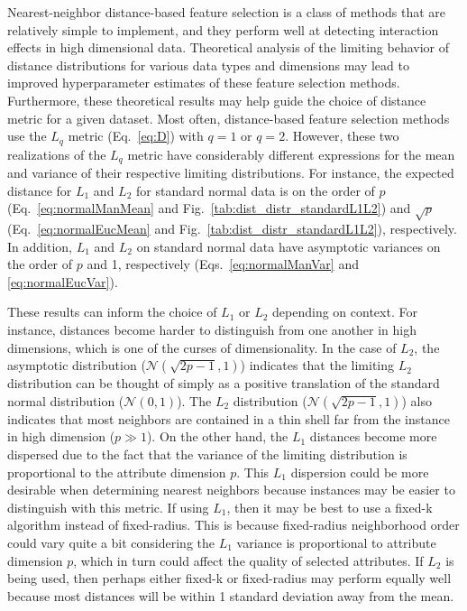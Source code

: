 \documentclass[10pt,letterpaper]{article}
\begin{document}
Nearest-neighbor distance-based feature selection is a class of methods that are relatively simple to implement, and they perform well at detecting interaction effects in high dimensional data. Theoretical analysis of the limiting behavior of distance distributions for various data types and dimensions may lead to improved hyperparameter estimates of these feature selection methods. Furthermore, these theoretical results may help guide the choice of distance metric for a given dataset. Most often, distance-based feature selection methods use the $L_q$ metric (Eq.~\ref{eq:D}) with $q=1$ or $q=2$. However, these two realizations of the $L_q$ metric have considerably different expressions for the mean and variance of their respective limiting distributions. For instance, the expected distance for $L_1$ and $L_2$ for standard normal data is on the order of $p$ (Eq.~\ref{eq:normalManMean} and Fig.~\ref{tab:dist_distr_standardL1L2}) and $\sqrt{p}$ (Eq.~\ref{eq:normalEucMean} and Fig.~\ref{tab:dist_distr_standardL1L2}), respectively. In addition, $L_1$ and $L_2$ on standard normal data have asymptotic variances on the order of $p$ and 1, respectively (Eqs.~\ref{eq:normalManVar} and \ref{eq:normalEucVar}). 

These results can inform the choice of $L_1$ or $L_2$ depending on context. For instance, distances become harder to distinguish from one another in high dimensions, which is one of the curses of dimensionality. In the case of $L_2$, the asymptotic distribution ($\mathcal{N}(\sqrt{2p - 1},1)$) indicates that the limiting $L_2$ distribution can be thought of simply as a positive translation of the standard normal distribution ($\mathcal{N}(0,1)$). The $L_2$ distribution ($\mathcal{N}(\sqrt{2p - 1},1)$) also indicates that most neighbors are contained in a thin shell far from the instance in high dimension ($p \gg 1$). On the other hand, the $L_1$ distances become more dispersed due to the fact that the variance of the limiting distribution is proportional to the attribute dimension $p$. This $L_1$ dispersion could be more desirable when determining nearest neighbors because instances may be easier to distinguish with this metric. If using $L_1$, then it may be best to use a fixed-k algorithm instead of fixed-radius. This is because fixed-radius neighborhood order could vary quite a bit considering the $L_1$ variance is proportional to attribute dimension $p$, which in turn could affect the quality of selected attributes. If $L_2$ is being used, then perhaps either fixed-k or fixed-radius may perform equally well because most distances will be within 1 standard deviation away from the mean. 
\end{document}

